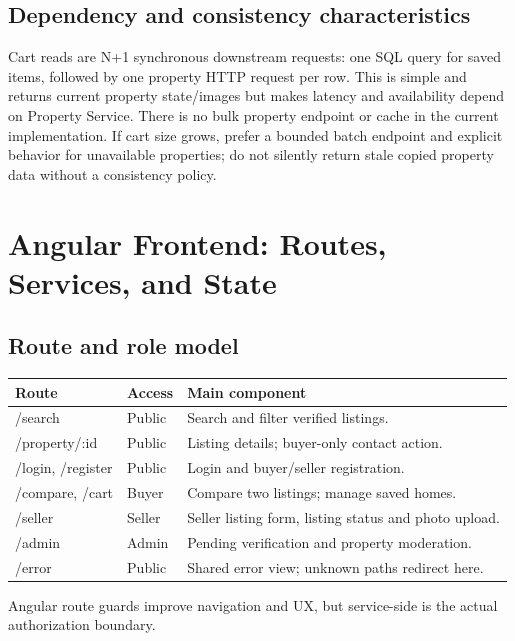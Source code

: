 \documentclass[10pt,a4paper]{article}
\newcommand{\code}[1]{\texttt{\detokenize{#1}}}
\begin{document}
\subsection{Dependency and consistency characteristics}
Cart reads are N+1 synchronous downstream requests: one SQL query for saved items,
followed by one property HTTP request per row. This is simple and returns current
property state/images but makes latency and availability depend on Property Service.
There is no bulk property endpoint or cache in the current implementation. If cart
size grows, prefer a bounded batch endpoint and explicit behavior for unavailable
properties; do not silently return stale copied property data without a consistency
policy.

\section{Angular Frontend: Routes, Services, and State}
\subsection{Route and role model}
\begin{tabularx}{\textwidth}{>{\ttfamily}p{29mm} p{30mm} X}
\toprule
Route & Access & Main component\\
\midrule
/search & Public & Search and filter verified listings.\\
/property/:id & Public & Listing details; buyer-only contact action.\\
/login, /register & Public & Login and buyer/seller registration.\\
/compare, /cart & Buyer & Compare two listings; manage saved homes.\\
/seller & Seller & Seller listing form, listing status and photo upload.\\
/admin & Admin & Pending verification and property moderation.\\
/error & Public & Shared error view; unknown paths redirect here.\\
\bottomrule
\end{tabularx}
Angular route guards improve navigation and UX, but service-side
\code{[Authorize(Roles=...)]} is the actual authorization boundary.
\end{document}
